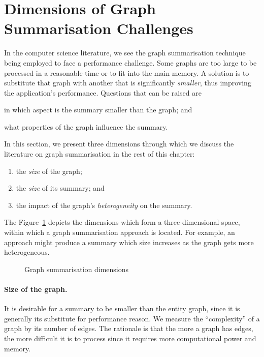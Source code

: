 \section{Dimensions of Graph Summarisation Challenges}

In the computer science literature, we see the graph summarisation technique being employed to face a performance challenge. Some graphs are too large to be processed in a reasonable time or to fit into the main memory. A solution is to substitute that graph with another that is significantly \emph{smaller}, thus improving the application's performance. Questions that can be raised are
\begin{inparaenum}[(a)]
\item in which aspect is the summary smaller than the graph; and
\item what properties of the graph influence the summary.
\end{inparaenum}
In this section, we present three dimensions through which we discuss the literature on graph summarisation in the rest of this chapter:
\begin{enumerate}
\item the \emph{size} of the graph;
\item the \emph{size} of its summary; and
\item the impact of the graph's \emph{heterogeneity} on the summary.
\end{enumerate}
The Figure~\ref{fig:gs-axis} depicts the dimensions which form a three-dimensional space, within which a graph summarisation approach is located. For example, an approach might produce a summary which size increases as the graph gets more heterogeneous.

\begin{figure}
	\centering
	\resizebox{.5\textwidth}{!}{
		
	}
	\caption{Graph summarisation dimensions}
	\label{fig:gs-axis}
\end{figure}

\paragraph{Size of the graph.}

It is desirable for a summary to be smaller than the entity graph, since it is generally its substitute for performance reason. We measure the ``complexity'' of a graph by its number of edges. The rationale is that the more a graph has edges, the more difficult it is to process since it requires more computational power and memory.
%

